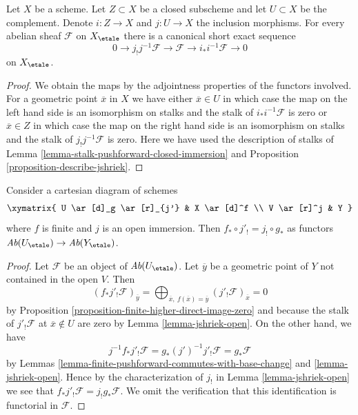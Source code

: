 \begin{lemma}
\label{lemma-ses-associated-to-open}
Let $X$ be a scheme. Let $Z \subset X$ be a closed subscheme and let
$U \subset X$ be the complement. Denote $i : Z \to X$ and $j : U \to X$
the inclusion morphisms. For every abelian sheaf $\mathcal{F}$ on $X_\etale$
there is a canonical short exact sequence
$$
0 \to j_!j^{-1}\mathcal{F} \to \mathcal{F} \to i_*i^{-1}\mathcal{F} \to 0
$$
on $X_\etale$.
\end{lemma}

\begin{proof}
We obtain the maps by the adjointness properties of the functors
involved. For a geometric point $\overline{x}$ in $X$ we have either
$\overline{x} \in U$ in which case the map on the left hand side
is an isomorphism on stalks and the stalk of $i_*i^{-1}\mathcal{F}$
is zero or $\overline{x} \in Z$ in which case the map on the right hand side
is an isomorphism on stalks and the stalk of $j_!j^{-1}\mathcal{F}$
is zero. Here we have used the description of stalks of
Lemma \ref{lemma-stalk-pushforward-closed-immersion} and
Proposition \ref{proposition-describe-jshriek}.
\end{proof}

\begin{lemma}
\label{lemma-compatible-shriek-push-finite}
Consider a cartesian diagram of schemes
$$
\xymatrix{
U \ar[d]_g \ar[r]_{j'} & X \ar[d]^f \\
V \ar[r]^j & Y
}
$$
where $f$ is finite and $j$ is an open immersion.
Then $f_* \circ j'_! = j_! \circ g_*$ as functors
$\textit{Ab}(U_\etale) \to \textit{Ab}(Y_\etale)$.
\end{lemma}

\begin{proof}
Let $\mathcal{F}$ be an object of $\textit{Ab}(U_\etale)$.
Let $\overline{y}$ be a geometric point of $Y$ not contained
in the open $V$. Then
$$
(f_*j'_!\mathcal{F})_{\overline{y}} =
\bigoplus\nolimits_{\overline{x},\ f(\overline{x}) = \overline{y}}
(j'_!\mathcal{F})_{\overline{x}} = 0
$$
by Proposition \ref{proposition-finite-higher-direct-image-zero} and
because the stalk of $j'_!\mathcal{F}$ at $\overline{x} \not \in U$
are zero by Lemma \ref{lemma-jshriek-open}. On the other hand, we have
$$
j^{-1}f_*j'_!\mathcal{F} =
g_*(j')^{-1}j'_!\mathcal{F} =
g_*\mathcal{F}
$$
by Lemmas \ref{lemma-finite-pushforward-commutes-with-base-change} and
\ref{lemma-jshriek-open}.
Hence by the characterization of
$j_!$ in Lemma \ref{lemma-jshriek-open} we see that
$f_*j'_!\mathcal{F} = j_!g_*\mathcal{F}$.
We omit the verification that this identification
is functorial in $\mathcal{F}$.
\end{proof}







